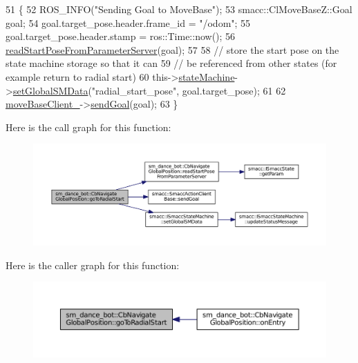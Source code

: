 \begin{DoxyCode}
51   \{
52     ROS\_INFO(\textcolor{stringliteral}{"Sending Goal to MoveBase"});
53     smacc::ClMoveBaseZ::Goal goal;
54     goal.target\_pose.header.frame\_id = \textcolor{stringliteral}{"/odom"};
55     goal.target\_pose.header.stamp = ros::Time::now();
56     \hyperlink{classsm__dance__bot_1_1CbNavigateGlobalPosition_a81b78925b3ab8a426f471cb74d0b9756}{readStartPoseFromParameterServer}(goal);
57 
58     \textcolor{comment}{// store the start pose on the state machine storage so that it can}
59     \textcolor{comment}{// be referenced from other states (for example return to radial start)}
60     this->\hyperlink{classsmacc_1_1SmaccClientBehavior_aa1c28c177d50a471c88c6a577cd6077e}{stateMachine}->\hyperlink{classsmacc_1_1ISmaccStateMachine_a8588f9e580fbb95b53e2bd2ca3ff1f98}{setGlobalSMData}(\textcolor{stringliteral}{"radial\_start\_pose"}, goal.target\_pose);
61 
62     \hyperlink{classsm__dance__bot_1_1CbNavigateGlobalPosition_a6b070ea39c113269c9b7f7732cb9e033}{moveBaseClient\_}->\hyperlink{classsmacc_1_1SmaccActionClientBase_a58c67a87c5fb8ea1633573c58fe3eee1}{sendGoal}(goal);
63   \}
\end{DoxyCode}


Here is the call graph for this function\+:
\nopagebreak
\begin{figure}[H]
\begin{center}
\leavevmode
\includegraphics[width=350pt]{classsm__dance__bot_1_1CbNavigateGlobalPosition_a0832f7a7f205cc483be012aef9501312_cgraph}
\end{center}
\end{figure}




Here is the caller graph for this function\+:
\nopagebreak
\begin{figure}[H]
\begin{center}
\leavevmode
\includegraphics[width=350pt]{classsm__dance__bot_1_1CbNavigateGlobalPosition_a0832f7a7f205cc483be012aef9501312_icgraph}
\end{center}
\end{figure}


